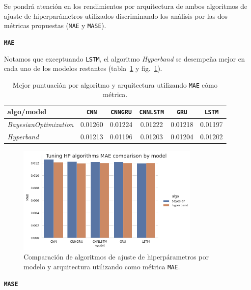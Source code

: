 \documentclass[a4paper,12pt]{article}
\begin{document}
Se pondrá atención en los rendimientos por arquitectura de ambos algoritmos de ajuste de hiperparámetros utilizados discriminando los análisis por las dos métricas propuestas (\texttt{MAE} y \texttt{MASE}). 

\hfill

\textbf{\texttt{MAE}}

Notamos que exceptuando \texttt{LSTM}, el algoritmo \textit{Hyperband} se desempeña mejor en cada uno de los modelos restantes (tabla~\ref{tab:algo_vs_arch_mae} y fig.~\ref{fig:algo_comparison_mae}).

\begin{table}[H]
\centering
\begin{tabular}{l|ccccc}
\hline
algo/model & \texttt{CNN} & \texttt{CNNGRU} & \texttt{CNNLSTM} & \texttt{GRU} & \texttt{LSTM} \\ \hline
\textit{BayesianOptimization}         & 0.01260     & 0.01224        & 0.01222         & 0.01218     & 0.01197      \\
\textit{Hyperband}         & 0.01213     & 0.01196        & 0.01203         & 0.01204     & 0.01202      \\ \hline
\end{tabular}
\caption{Mejor puntuación por algoritmo y arquitectura utilizando \texttt{MAE} cómo métrica.}
\label{tab:algo_vs_arch_mae}
\end{table}

\begin{figure}[H]
	\begin{center}
	\includegraphics[width=0.8\textwidth]{model_vs_algo_hp_mae.png}
  	\caption{Comparación de algoritmos de ajuste de hiperpárametros por modelo y arquitectura utilizando como métrica \texttt{MAE}.}
  	\label{fig:algo_comparison_mae}
  	\end{center}
\end{figure}

\textbf{\texttt{MASE}}
\end{document}
